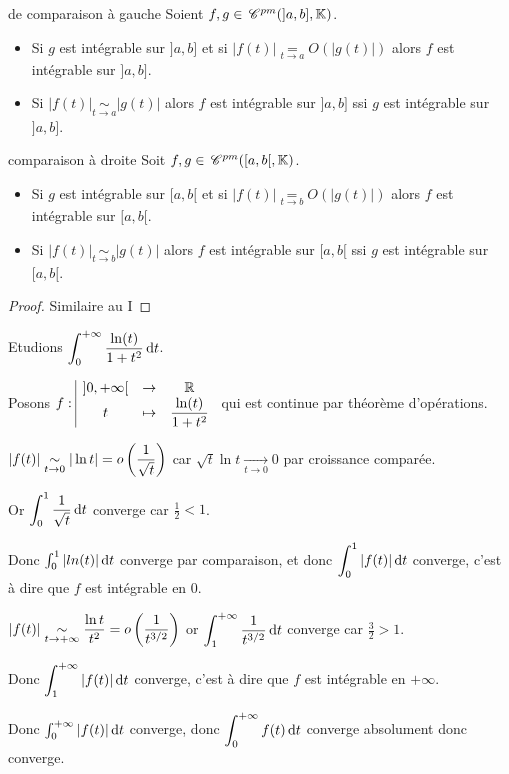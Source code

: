 \begin{theoreme}{de comparaison à gauche}{}
    Soient $f, g \in \,\mathscr C^{pm}(]a, b], \mathbb{K})$. 
    
    \begin{itemize}
        \item Si $g$ est intégrable sur $]a, b]$ et si $|f(t)| \underset{t \to a   }{= } O(|g(t)|)$
    alors $f$ est intégrable sur $]a, b]$.
        \item Si $|f(t)| \underset{t \to a   }{\sim } |g(t)|$ alors $f$ est intégrable sur $]a, b]$ ssi $g$ est intégrable sur $]a, b]$.
    \end{itemize}
\end{theoreme}

\begin{theoreme}{comparaison à droite}{}
    Soit $f, g \in \,\mathscr C^{pm}([a, b[, \mathbb{K})$. 
    
    \begin{itemize}
        \item Si $g$ est intégrable sur $[a, b[$ et si $|f(t)| \underset{t \to b   }{= } O(|g(t)|)$
    alors $f$ est intégrable sur $[a, b[$.
        \item Si $|f(t)| \underset{t \to b   }{\sim } |g(t)|$ alors $f$ est intégrable sur $[a, b[$ ssi $g$ est intégrable sur $[a, b[$.
    \end{itemize}
\end{theoreme}

\begin{proof}
    Similaire au I
\end{proof}

\begin{exemple}
    Etudions $\displaystyle \int_{0}^{+ \infty   } \frac{\ln (t)}{1 + t^2} \,\mathrm{d}t$. 

    Posons $f: \space \begin{array}{|ccc} \displaystyle ]0, + \infty[ & \to & \displaystyle \mathbb{R} \\ \displaystyle t & \mapsto & \displaystyle \frac{\ln (t)}{1 + t^2} \end{array}$ qui est continue par théorème d'opérations.


    \svspace $\displaystyle |f(t)| \underset{t \to 0   }{\sim } |\ln t| = o \left( \frac 1 {\sqrt t} \right)$
    car $\sqrt t \ln t \xrightarrow[t \to 0 ]{} 0$ par croissance comparée. 

    Or $\displaystyle \int_{0}^{1 } \frac 1 {\sqrt t} \,\mathrm{d}t$ converge car $\frac 1 2 < 1$. 

    Donc $\int_0^1 |ln(t) | \,\mathrm{d}t$ converge par comparaison, et donc 
    $\displaystyle \int_{0}^{1 } |f(t)| \,\mathrm{d}t$ converge, c'est à dire que $f$ est intégrable en $0$.


    \svspace $\displaystyle |f(t)| \underset{t \to + \infty   }{\sim } \frac{\ln t}{t^2} = o \left( \frac 1 {t^{3/2}} \right)$
    or $\displaystyle \int_{1 }^{+ \infty   } \frac 1 {t^{3/2}} \,\mathrm{d}t$ converge car $\frac 3 2 > 1$.

    Donc $\displaystyle \int_{1 }^{+ \infty   } |f(t)| \,\mathrm{d}t$ converge, c'est à dire que $f$ est intégrable en $+ \infty$.

    Donc $\int_0^{+ \infty} | f(t) | \,\mathrm{d}t$ converge, donc $\displaystyle \int_{0}^{+ \infty   } f(t) \,\mathrm{d}t$ converge absolument donc converge.
\end{exemple}

